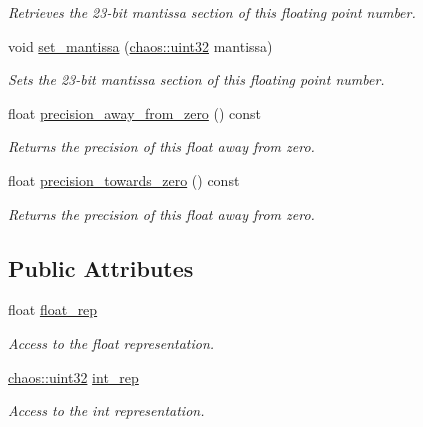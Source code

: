 \begin{DoxyCompactItemize}
\begin{DoxyCompactList}\small\item\em Retrieves the 23-\/bit mantissa section of this floating point number. \end{DoxyCompactList}\item 
void \hyperlink{unionchaos_1_1data_1_1_bitwise_float_a57629a8a0c7aaff58ba05bcab7831ce6}{set\+\_\+mantissa} (\hyperlink{namespacechaos_a8641b3ae4551f0b35570d4f9f4ec22d9}{chaos\+::uint32} mantissa)
\begin{DoxyCompactList}\small\item\em Sets the 23-\/bit mantissa section of this floating point number. \end{DoxyCompactList}\item 
float \hyperlink{unionchaos_1_1data_1_1_bitwise_float_ab38870254ea2295c45556e9aa51c2554}{precision\+\_\+away\+\_\+from\+\_\+zero} () const 
\begin{DoxyCompactList}\small\item\em Returns the precision of this float away from zero. \end{DoxyCompactList}\item 
float \hyperlink{unionchaos_1_1data_1_1_bitwise_float_a4acc915134b0cdab21c6e3c30842754d}{precision\+\_\+towards\+\_\+zero} () const 
\begin{DoxyCompactList}\small\item\em Returns the precision of this float away from zero. \end{DoxyCompactList}\end{DoxyCompactItemize}
\subsection*{Public Attributes}
\begin{DoxyCompactItemize}
\item 
\hypertarget{unionchaos_1_1data_1_1_bitwise_float_ab763103c6f0079798d187c8c27612259}{}float \hyperlink{unionchaos_1_1data_1_1_bitwise_float_ab763103c6f0079798d187c8c27612259}{float\+\_\+rep}\label{unionchaos_1_1data_1_1_bitwise_float_ab763103c6f0079798d187c8c27612259}

\begin{DoxyCompactList}\small\item\em Access to the float representation. \end{DoxyCompactList}\item 
\hypertarget{unionchaos_1_1data_1_1_bitwise_float_a5dc7a9d68bc17cecceec14da1ac9b592}{}\hyperlink{namespacechaos_a8641b3ae4551f0b35570d4f9f4ec22d9}{chaos\+::uint32} \hyperlink{unionchaos_1_1data_1_1_bitwise_float_a5dc7a9d68bc17cecceec14da1ac9b592}{int\+\_\+rep}\label{unionchaos_1_1data_1_1_bitwise_float_a5dc7a9d68bc17cecceec14da1ac9b592}

\begin{DoxyCompactList}\small\item\em Access to the int representation. \end{DoxyCompactList}\end{DoxyCompactItemize}


